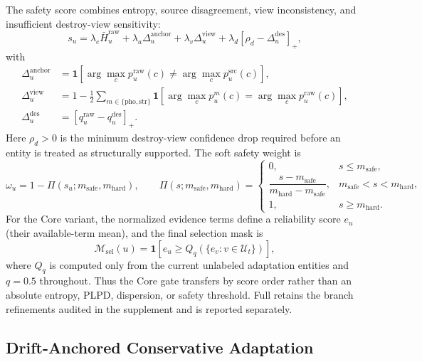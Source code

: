 The safety score combines entropy, source disagreement, view inconsistency, and insufficient destroy-view sensitivity:
\begin{equation}
s_u
=
\lambda_e\bar H_u^{\mathrm{raw}}
+\lambda_a\Delta_u^{\mathrm{anchor}}
+\lambda_v\Delta_u^{\mathrm{view}}
+\lambda_d[\rho_d-\Delta_u^{\mathrm{des}}]_+,
\label{eq:safety_score}
\end{equation}
with
\begin{equation}
\begin{aligned}
\Delta_u^{\mathrm{anchor}}
&=
\mathbf{1}\!\left[
\arg\max_c p_u^{\mathrm{raw}}(c)
\ne
\arg\max_c p_u^{\mathrm{src}}(c)
\right],\\
\Delta_u^{\mathrm{view}}
&=
1-\frac{1}{2}
\sum_{m\in\{\mathrm{pho},\mathrm{str}\}}
\mathbf{1}\!\left[
\arg\max_c p_u^m(c)
=
\arg\max_c p_u^{\mathrm{raw}}(c)
\right],\\
\Delta_u^{\mathrm{des}}
&=
[q_u^{\mathrm{raw}}-q_u^{\mathrm{des}}]_+ .
\end{aligned}
\label{eq:safety_terms}
\end{equation}
Here $\rho_d>0$ is the minimum destroy-view confidence drop required before an entity is treated as structurally supported.
The soft safety weight is
\begin{equation}
\omega_u
=
1-\Pi(s_u;m_{\mathrm{safe}},m_{\mathrm{hard}}),
\qquad
\Pi(s;m_{\mathrm{safe}},m_{\mathrm{hard}})
=
\begin{cases}
0, & s\le m_{\mathrm{safe}},\\[2pt]
\dfrac{s-m_{\mathrm{safe}}}{m_{\mathrm{hard}}-m_{\mathrm{safe}}},
& m_{\mathrm{safe}}<s<m_{\mathrm{hard}},\\[8pt]
1, & s\ge m_{\mathrm{hard}}.
\end{cases}
\label{eq:safe}
\end{equation}
For the Core variant, the normalized evidence terms define a reliability score
$e_u$ (their available-term mean), and the final selection mask is
\begin{equation}
\mathcal{M}_{\mathrm{sel}}(u)
=
\mathbf{1}\!\left[e_u\ge Q_q(\{e_v:v\in\mathcal U_t\})\right],
\label{eq:selected}
\end{equation}
where $Q_q$ is computed only from the current unlabeled adaptation entities and
$q=0.5$ throughout. Thus the Core gate transfers by score order rather than an
absolute entropy, PLPD, dispersion, or safety threshold. Full retains the
branch refinements audited in the supplement and is reported separately.

\subsection{Drift-Anchored Conservative Adaptation}

